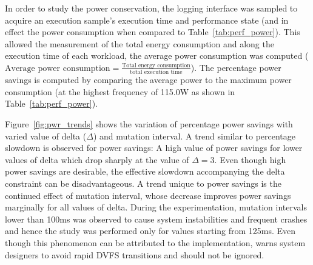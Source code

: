 In order to study the power conservation, the logging interface was sampled to acquire
an execution sample's execution time and performance state (and in effect the power consumption
when compared to Table~\ref{tab:perf_power}). This allowed the measurement of the total 
energy consumption and along the execution time of each workload, the average power 
consumption was computed ($\text{Average power consumption} = \frac{\text{Total energy consumption}}{\text{total execution time}}$).
The percentage power savings is computed
by comparing the average power to the maximum power consumption (at the highest
frequency of 115.0W as shown in Table~\ref{tab:perf_power}).

Figure~\ref{fig:pwr_trends} shows the variation of percentage power savings with varied value 
of delta ($\Delta$) and mutation interval. A trend similar to percentage slowdown is observed
for power savings: A high value of power savings for lower values of delta which drop sharply 
at the value of $\Delta = 3$. Even though high power savings are desirable, the effective 
slowdown accompanying the delta constraint can be disadvantageous. A trend unique to power savings is the 
continued effect of mutation interval, whose decrease improves power savings marginally for all values of delta.
During the experimentation, mutation intervals lower than 100ms was observed to cause system
instabilities and frequent crashes and hence the study was performed only for values starting
from 125ms. Even though this phenomenon can be attributed to the implementation, \cite{ImpactDVFS} warns 
system designers to avoid rapid DVFS transitions and should not be ignored.


